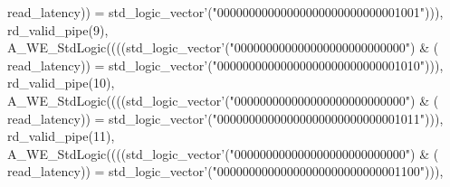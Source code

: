\begin{DoxyCode}
{      read_latency}\textcolor{vhdlchar}{)}\textcolor{vhdlchar}{)} \textcolor{vhdlchar}{=} \textcolor{comment}{std\_logic\_vector}\textcolor{vhdlchar}{'}\textcolor{vhdlchar}{(}\textcolor{vhdllogic}{"00000000000000000000000000001001"}\textcolor{vhdlchar}{)}\textcolor{vhdlchar}{)}\textcolor{vhdlchar}{)}\textcolor{vhdlchar}{,} \textcolor{vhdlchar}{
      rd_valid_pipe}\textcolor{vhdlchar}{(}\textcolor{vhdllogic}{}\textcolor{vhdllogic}{9}\textcolor{vhdlchar}{)}\textcolor{vhdlchar}{,} \textcolor{vhdlchar}{A\_WE\_StdLogic}\textcolor{vhdlchar}{(}\textcolor{vhdlchar}{(}\textcolor{vhdlchar}{(}\textcolor{vhdlchar}{(}\textcolor{comment}{std\_logic\_vector}\textcolor{vhdlchar}{'}\textcolor{vhdlchar}{(}\textcolor{vhdllogic}{"000000000000000000000000000"}\textcolor{vhdlchar}{)} \textcolor{vhdlchar}{&} \textcolor{vhdlchar}{(}\textcolor{vhdlchar}{
      read_latency}\textcolor{vhdlchar}{)}\textcolor{vhdlchar}{)} \textcolor{vhdlchar}{=} \textcolor{comment}{std\_logic\_vector}\textcolor{vhdlchar}{'}\textcolor{vhdlchar}{(}\textcolor{vhdllogic}{"00000000000000000000000000001010"}\textcolor{vhdlchar}{)}\textcolor{vhdlchar}{)}\textcolor{vhdlchar}{)}\textcolor{vhdlchar}{,} \textcolor{vhdlchar}{
      rd_valid_pipe}\textcolor{vhdlchar}{(}\textcolor{vhdllogic}{}\textcolor{vhdllogic}{10}\textcolor{vhdlchar}{)}\textcolor{vhdlchar}{,} \textcolor{vhdlchar}{A\_WE\_StdLogic}\textcolor{vhdlchar}{(}\textcolor{vhdlchar}{(}\textcolor{vhdlchar}{(}\textcolor{vhdlchar}{(}\textcolor{comment}{std\_logic\_vector}\textcolor{vhdlchar}{'}\textcolor{vhdlchar}{(}\textcolor{vhdllogic}{"000000000000000000000000000"}\textcolor{vhdlchar}{)} \textcolor{vhdlchar}{&} \textcolor{vhdlchar}{(}\textcolor{vhdlchar}{
      read_latency}\textcolor{vhdlchar}{)}\textcolor{vhdlchar}{)} \textcolor{vhdlchar}{=} \textcolor{comment}{std\_logic\_vector}\textcolor{vhdlchar}{'}\textcolor{vhdlchar}{(}\textcolor{vhdllogic}{"00000000000000000000000000001011"}\textcolor{vhdlchar}{)}\textcolor{vhdlchar}{)}\textcolor{vhdlchar}{)}\textcolor{vhdlchar}{,} \textcolor{vhdlchar}{
      rd_valid_pipe}\textcolor{vhdlchar}{(}\textcolor{vhdllogic}{}\textcolor{vhdllogic}{11}\textcolor{vhdlchar}{)}\textcolor{vhdlchar}{,} \textcolor{vhdlchar}{A\_WE\_StdLogic}\textcolor{vhdlchar}{(}\textcolor{vhdlchar}{(}\textcolor{vhdlchar}{(}\textcolor{vhdlchar}{(}\textcolor{comment}{std\_logic\_vector}\textcolor{vhdlchar}{'}\textcolor{vhdlchar}{(}\textcolor{vhdllogic}{"000000000000000000000000000"}\textcolor{vhdlchar}{)} \textcolor{vhdlchar}{&} \textcolor{vhdlchar}{(}\textcolor{vhdlchar}{
      read_latency}\textcolor{vhdlchar}{)}\textcolor{vhdlchar}{)} \textcolor{vhdlchar}{=} \textcolor{comment}{std\_logic\_vector}\textcolor{vhdlchar}{'}\textcolor{vhdlchar}{(}\textcolor{vhdllogic}{"00000000000000000000000000001100"}\textcolor{vhdlchar}{)}\textcolor{vhdlchar}{)}\textcolor{vhdlchar}{)}\textcolor{vhdlchar}{,} \textcolor{vhdlchar}{
}
\end{DoxyCode}
